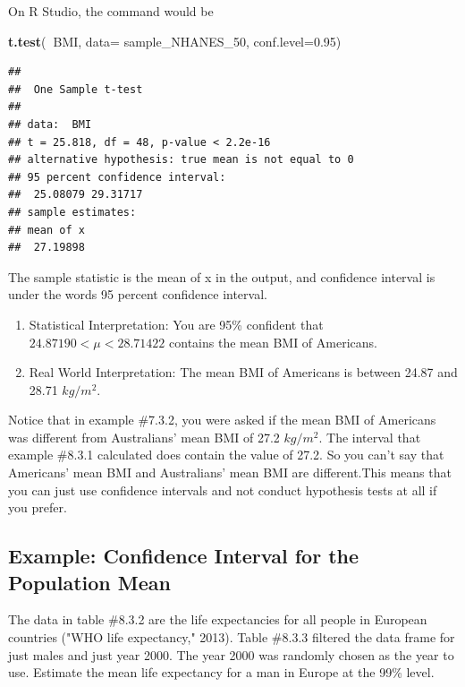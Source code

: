 \documentclass[
]{book}
\newenvironment{Shaded}{\begin{snugshade}}{\end{snugshade}}
\newcommand{\DataTypeTok}[1]{\textcolor[rgb]{0.13,0.29,0.53}{#1}}
\newcommand{\DecValTok}[1]{\textcolor[rgb]{0.00,0.00,0.81}{#1}}
\newcommand{\FloatTok}[1]{\textcolor[rgb]{0.00,0.00,0.81}{#1}}
\newcommand{\KeywordTok}[1]{\textcolor[rgb]{0.13,0.29,0.53}{\textbf{#1}}}
\newcommand{\NormalTok}[1]{#1}
\newcommand{\OperatorTok}[1]{\textcolor[rgb]{0.81,0.36,0.00}{\textbf{#1}}}
\begin{document}
On R Studio, the command would be

\begin{Shaded}
\begin{Highlighting}[]
\KeywordTok{t.test}\NormalTok{(}\OperatorTok{~}\NormalTok{BMI, }\DataTypeTok{data=}\NormalTok{ sample_NHANES_}\DecValTok{50}\NormalTok{, }\DataTypeTok{conf.level=}\FloatTok{0.95}\NormalTok{)}
\end{Highlighting}
\end{Shaded}

\begin{verbatim}
## 
## 	One Sample t-test
## 
## data:  BMI
## t = 25.818, df = 48, p-value < 2.2e-16
## alternative hypothesis: true mean is not equal to 0
## 95 percent confidence interval:
##  25.08079 29.31717
## sample estimates:
## mean of x 
##  27.19898
\end{verbatim}

The sample statistic is the mean of x in the output, and confidence interval is under the words 95 percent confidence interval.

\begin{enumerate}
\def\labelenumi{\arabic{enumi}.}
\setcounter{enumi}{3}
\item
  Statistical Interpretation: You are 95\% confident that \(24.87190<\mu<28.71422\) contains the mean BMI of Americans.
\item
  Real World Interpretation: The mean BMI of Americans is between 24.87 and 28.71 \(kg/m^2\).
\end{enumerate}

Notice that in example \#7.3.2, you were asked if the mean BMI of Americans was different from Australians' mean BMI of 27.2 \(kg/m^2\). The interval that example \#8.3.1 calculated does contain the value of 27.2. So you can't say that Americans' mean BMI and Australians' mean BMI are different.This means that you can just use confidence intervals and not conduct hypothesis tests at all if you prefer.

\hypertarget{example-confidence-interval-for-the-population-mean-1}{%
\subsection{Example: Confidence Interval for the Population Mean}\label{example-confidence-interval-for-the-population-mean-1}}

The data in table \#8.3.2 are the life expectancies for all people in European countries ("WHO life expectancy," 2013). Table \#8.3.3 filtered the data frame for just males and just year 2000. The year 2000 was randomly chosen as the year to use. Estimate the mean life expectancy for a man in Europe at the 99\% level.
\end{document}
